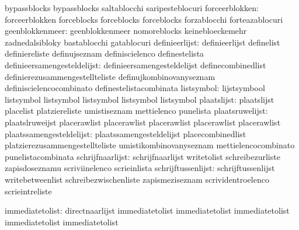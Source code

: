                                   bypassblocks                     bypassblocks
                                  saltablocchi                     saripesteblocuri
                 forceerblokken:  forceerblokken                   forceblocks
                                  forceblocks                      forceblocks
                                  forzablocchi                     forteazablocuri
                geenblokkenmeer:  geenblokkenmeer                  nomoreblocks
                                  keinebloeckemehr                 zadnedalsibloky
                                  bastablocchi                     gatablocuri
                 definieerlijst:  definieerlijst                   definelist
                                  definiereliste                   definujseznam
                                  definiscielenco                  definestelista
    definieersamengesteldelijst:  definieersamengesteldelijst      definecombinedlist
                                  definierezusammengestellteliste  definujkombinovanyseznam
                                  definiscielencocombinato         definestelistacombinata
listsymbol: lijstsymbool listsymbol
            listsymbol   listsymbol
            listsymbol   listsymbol
                    plaatslijst:  plaatslijst                      placelist
                                  platziereliste                   umistiseznam
                                  mettielenco                      punelista
                plaatsruwelijst:  plaatslruweijst                  placerawlist
                                  placerawlist                     placerawlist
                                  placerawlist                     placerawlist
       plaatssamengesteldelijst:  plaatssamengesteldelijst         placecombinedlist
                                  platzierezusammengestellteliste  umistikombinovanyseznam
                                  mettielencocombinato             punelistacombinata
               schrijfnaarlijst:  schrijfnaarlijst                 writetolist
                                  schreibezurliste                 zapisdoseznamu
                                  scriviinelenco                   scrieinlista
             schrijftussenlijst:  schrijftussenlijst               writebetweenlist
                                  schreibezwischenliste            zapismeziseznam
                                  scrividentroelenco               scrieintreliste


                 immediatetolist: directnaarlijst                  immediatetolist
                                  immediatetolist                  immediatetolist
                                  immediatetolist                  immediatetolist

